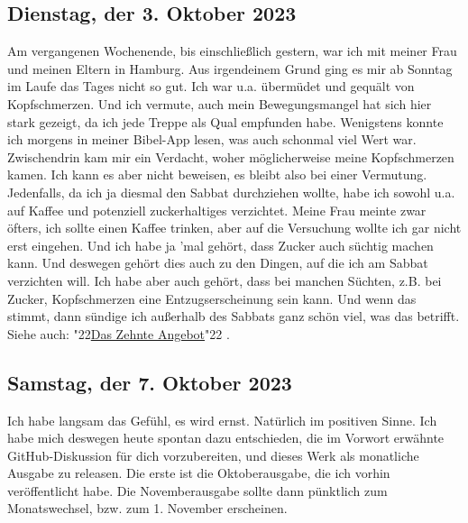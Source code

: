 \documentclass[10pt,a5paper]{article}
\newcommand{\q}[1]{\char"22{#1}\char"22 }
\begin{document}
	\subsection{Dienstag, der 3. Oktober 2023}
		Am vergangenen Wochenende,
		bis einschlie{\ss}lich gestern,
		war ich mit meiner Frau und meinen Eltern in Hamburg.
		Aus irgendeinem Grund ging es mir ab Sonntag im Laufe das Tages nicht so gut.
		Ich war u.a. \"uberm\"udet und gequ\"alt von Kopfschmerzen.
		Und ich vermute,
		auch mein Bewegungsmangel hat sich hier stark gezeigt,
		da ich jede Treppe als Qual empfunden habe.
		Wenigstens konnte ich morgens in meiner Bibel-App lesen,
		was auch schonmal viel Wert war.
		Zwischendrin kam mir ein Verdacht,
		woher m\"oglicherweise meine Kopfschmerzen kamen.
		Ich kann es aber nicht beweisen,
		es bleibt also bei einer Vermutung.
		Jedenfalls,
		da ich ja diesmal den Sabbat durchziehen wollte,
		habe ich sowohl u.a. auf Kaffee und potenziell zuckerhaltiges verzichtet.
		Meine Frau meinte zwar \"ofters,
		ich sollte einen Kaffee trinken,
		aber auf die Versuchung wollte ich gar nicht erst eingehen.
		Und ich habe ja 'mal geh\"ort,
		dass Zucker auch s\"uchtig machen kann.
		Und deswegen geh\"ort dies auch zu den Dingen,
		auf die ich am Sabbat verzichten will.
		Ich habe aber auch geh\"ort,
		dass bei manchen S\"uchten,
		z.B. bei Zucker,
		Kopfschmerzen eine Entzugserscheinung sein kann.
		Und wenn das stimmt,
		dann s\"undige ich au{\ss}erhalb des Sabbats ganz sch\"on viel,
		was das betrifft.
		Siehe auch: \q{\hyperref[DasZehnteAngebot]{Das Zehnte Angebot}}.
		
	\subsection{Samstag, der 7. Oktober 2023}
		Ich habe langsam das Gef\"uhl,
		es wird ernst.
		Nat\"urlich im positiven Sinne.
		Ich habe mich deswegen heute spontan dazu entschieden,
		die im Vorwort erw\"ahnte GitHub-Diskussion f\"ur dich vorzubereiten,
		und dieses Werk als monatliche Ausgabe zu releasen.
		Die erste ist die Oktoberausgabe,
		die ich vorhin ver\"offentlicht habe.
		Die Novemberausgabe sollte dann p\"unktlich zum Monatswechsel,
		bzw. zum 1. November erscheinen.
	
\end{document}
